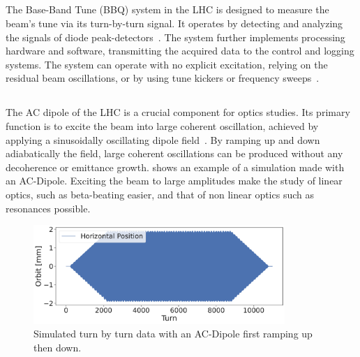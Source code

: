 \subsection{}

The Base-Band Tune (BBQ) system in the LHC is designed to measure the beam's tune via its
turn-by-turn signal. It operates by detecting and analyzing the signals of diode
peak-detectors~\cite{boccardi_first_2009}. The system further implements processing hardware and
software, transmitting the acquired data to the control and logging systems.
The system can operate with no explicit excitation, relying on the residual beam
oscillations, or by using tune kickers or frequency sweeps~\cite{boccardi_first_2009}.


\subsection{}

The AC dipole of the LHC is a crucial component for optics studies. Its primary function is to
excite the beam into large coherent oscillation, achieved by applying a sinusoidally oscillating
dipole field~\cite{miyamoto_parametrization_2008}. By ramping up and down adiabatically the field,
large coherent oscillations can be produced without any decoherence or emittance growth.
 shows an example of a simulation made with an AC-Dipole. Exciting the beam to
large amplitudes make the study of linear optics, such as beta-beating easier, and that of non
linear optics such as resonances possible.

\begin{figure}
    \center
    \includegraphics[width=0.85\textwidth]{./images/ac_dipole_tbt.pdf}
    \caption{Simulated turn by turn data with an AC-Dipole first ramping up then down.} 
    \label{fig:ac_dipole}
\end{figure}

